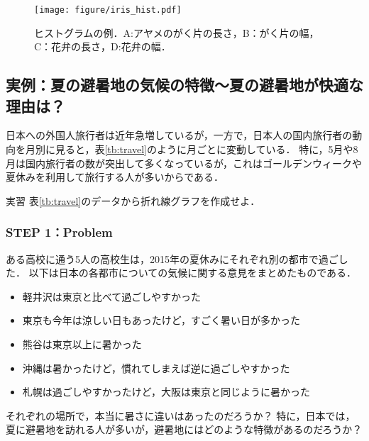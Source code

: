 %
\begin{figure}[H]
	\centering
	\texttt{[image: figure/iris\_hist.pdf]}
	\caption{ヒストグラムの例．A:アヤメのがく片の長さ，B：がく片の幅，C：花弁の長さ，D:花弁の幅．}
	\label{fig:iris_hist}
\end{figure}
%

\subsection{実例：夏の避暑地の気候の特徴〜夏の避暑地が快適な理由は？}
%
日本への外国人旅行者は近年急増しているが，一方で，日本人の国内旅行者の動向を月別に見ると，表\ref{tb:travel}のように月ごとに変動している．
%
特に，5月や8月は国内旅行者の数が突出して多くなっているが，これはゴールデンウィークや夏休みを利用して旅行する人が多いからである．
%

\begin{itembox}[l]{実習}
%
表\ref{tb:travel}のデータから折れ線グラフを作成せよ．
%
\end{itembox}

\begin{table}[H]
\centering
\caption{2015年の月別国内旅行者数（観光庁「2015年旅行・観光消費動向調査」より）}
\label{tb:travel}
\end{table}

\subsubsection*{STEP 1：Problem}
%
ある高校に通う5人の高校生は，2015年の夏休みにそれぞれ別の都市で過ごした．
%
以下は日本の各都市についての気候に関する意見をまとめたものである．
%
\begin{itemize}
\item
軽井沢は東京と比べて過ごしやすかった
\item
東京も今年は涼しい日もあったけど，すごく暑い日が多かった
\item
熊谷は東京以上に暑かった
\item
沖縄は暑かったけど，慣れてしまえば逆に過ごしやすかった
\item
札幌は過ごしやすかったけど，大阪は東京と同じように暑かった
\end{itemize}
%
それぞれの場所で，本当に暑さに違いはあったのだろうか？
%
特に，日本では，夏に避暑地を訪れる人が多いが，避暑地にはどのような特徴があるのだろうか？
%

